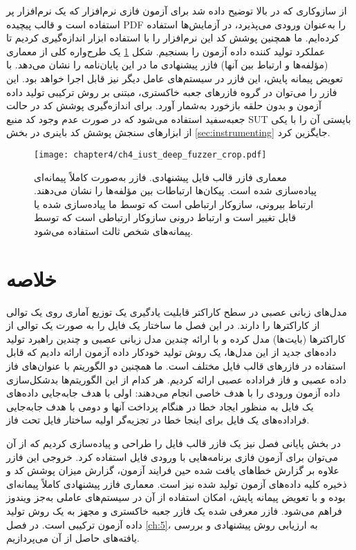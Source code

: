 از سازوکاری که در بالا توضیح داده شد برای آزمون فازی نرم‌افزار  که یک نرم‌افزار پر استفاده است و قالب پیچیده \gls{PDF} را به‌عنوان ورودی می‌پذیرد، در آزمایش‌ها استفاده کرده‌ایم. ما همچنین پوشش کد این نرم‌افزار را با استفاده ابزار    اندازه‌گیری کردیم تا عملکرد تولید کننده داده آزمون را بسنجیم. شکل \ref{ch4_iust_deep_fuzzer_crop.pdf} یک طرح‌واره کلی از معماری (مؤلفه‌ها و ارتباط بین آنها) فازر پیشنهادی ما در این پایان‌نامه را نشان می‌دهد. با تعویض پیمانه‌ پایش، این فازر در سیستم‌های عامل دیگر نیز قابل اجرا خواهد بود. این فازر را می‌توان در گروه فازرهای جعبه خاکستری، مبتنی بر روش ترکیبی تولید داده آزمون و بدون حلقه بازخورد به‌شمار آورد.  برای اندازه‌گیری پوشش کد در حالت جعبه‌سفید استفاده می‌شود که در صورت عدم وجود کد منبع \gls{SUT} بایستی آن را با یکی از ابزارهای سنجش پوشش کد باینری در بخش \ref{sec:instrumenting} جایگزین کرد.


\begin{figure}%
	\centering
	\texttt{[image: chapter4/ch4\_iust\_deep\_fuzzer\_crop.pdf]}
	\caption[معماری فازر قالب فایل پیشنهادی و ارتباط بین مؤلفه‌های مختلف آن]
	{
		معماری فازر قالب فایل پیشنهادی. فازر به‌صورت کاملاً پیمانه‌ای پیاده‌سازی شده است. پیکان‌ها ارتباطات بین مؤلفه‌ها را نشان می‌دهند. ارتباط بیرونی، سازوکار ارتباطی است که توسط ما پیاده‌سازی شده یا قابل تغییر است و ارتباط درونی سازو‌کار ارتباطی است که توسط پیمانه‌های شخص ثالث استفاده می‌شود. 
	}
	\label{ch4_iust_deep_fuzzer_crop.pdf}
\end{figure}




\section{خلاصه}
مدل‌های زبانی عصبی در سطح کاراکتر قابلیت یادگیری یک توزیع آماری روی یک توالی از کاراکترها را دارند. در این فصل ما ساختار یک فایل را به صورت یک توالی از کاراکترها (بایت‌ها) مدل کرده و با ارائه چندین مدل زبانی عصبی و چندین راهبرد تولید داده‌های جدید از این مدل‌ها، یک روش تولید خودکار داده آزمون ارائه دادیم که قابل استفاده در فازرهای قالب فایل مختلف است. ما همچنین دو الگوریتم با عنوان‌های فاز داده عصبی و فاز فراداده عصبی ارائه کردیم. هر کدام از این الگوریتم‌ها بدشکل‌سازی داده آزمون ورودی را با هدف خاصی انجام می‌دهند: اولی با هدف جابه‌جایی داده‌های یک فایل به منظور ایجاد خطا در هنگام پرداخت آنها و دومی با هدف جابه‌جایی فراداده‌های یک فایل برای اینجا خطا در تجزیه‌گر اولیه ساختار فایل تحت فاز. 

در بخش پایانی فصل نیز یک فازر قالب فایل را طراحی و پیاده‌سازی کردیم که از آن می‌توان برای آزمون فازی برنامه‌هایی با ورودی فایل استفاده کرد. خروجی این فازر علاوه بر گزارش خطاهای یافت شده حین فرایند آزمون، گزارش میزان پوشش کد و ذخیره کلیه داده‌های آزمون تولید شده نیز است. معماری فازر پیشنهادی کاملاً پیمانه‌ای بوده و با تعویض پیمانه‌ پایش، امکان استفاده از آن در سیستم‌های عاملی به‌جز ویندوز فراهم می‌شود. فازر معرفی شده یک فازر جعبه خاکستری و مجهز به یک روش تولید داده آزمون ترکیبی است. در فصل \ref{ch:5}، به ارزیابی روش پیشنهادی و بررسی یافته‌های حاصل از آن می‌پردازیم.






